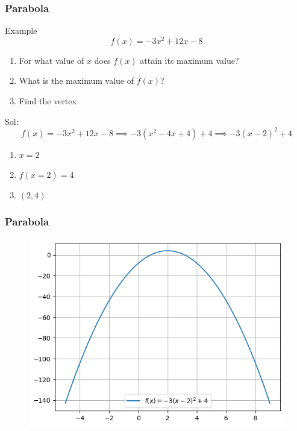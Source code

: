 \documentclass{beamer}
\begin{document}
  
  \begin{frame}
    \frametitle{Parabola}
   \begin{exampleblock}{Example}
    \[f(x) = -3x^{2} + 12x - 8 \]
    \begin{enumerate}
      \item For what value of \(x\) does \(f (x) \) attain its maximum value?
      \item What is the maximum value of \(f (x)\)?
      \item Find the vertex 
    \end{enumerate}
   \end{exampleblock}
   Sol: \\ 
   \[f(x) = -3x^{2} + 12x - 8 \implies -3(x^{2} - 4x + 4) + 4 \implies -3(x-2)^{2} + 4 \]
   \begin{enumerate}
    \item \(x = 2\)
    \item \(f(x=2) = 4\)
    \item \( (2,4) \)
   \end{enumerate}
  \end{frame}
 \begin{frame}
  \frametitle{Parabola}
  \begin{figure}
    \centering
    \includegraphics[scale=0.6]{parabola.png}
  \end{figure}
 \end{frame}
\end{document}
